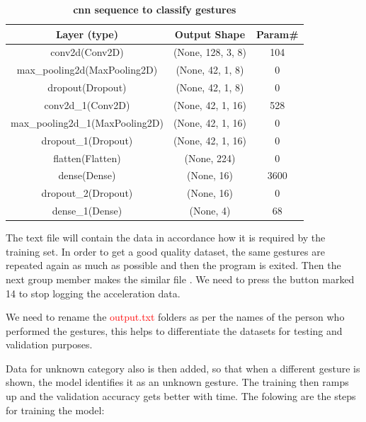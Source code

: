 \begin{table}
    \caption{\textbf{\ac{cnn} sequence to classify gestures }}
    \label{Table 7.1}
    
    \begin{center}
        \begin{tabular}{||c c c||} 
            \hline
            Layer (type) & Output Shape & Param\# \\ [0.5ex] 
            \hline\hline
            conv2d(Conv2D) & (None, 128, 3, 8) & 104 \\ 
            \hline
            max\_pooling2d(MaxPooling2D) & (None, 42, 1, 8) & 0 \\
            \hline
            dropout(Dropout) & (None, 42, 1, 8) & 0  \\
            \hline
            conv2d\_1(Conv2D) & (None, 42, 1, 16) & 528 \\
            \hline
            max\_pooling2d\_1(MaxPooling2D) & (None, 42, 1, 16) & 0 \\  
            \hline
            dropout\_1(Dropout) & (None, 42, 1, 16) & 0  \\
            \hline
            flatten(Flatten) & (None, 224) & 0  \\
            \hline
            dense(Dense) & (None, 16) & 3600  \\  
            \hline
            dropout\_2(Dropout) & (None, 16) & 0  \\
            \hline
            dense\_1(Dense) & (None, 4) & 68  \\ [1ex] 
            \hline
        \end{tabular}
    \end{center}
\end{table}	

The text file will contain the data in accordance how it is required by the training set. In order to get a good quality dataset, the same gestures are repeated again as much as possible and then the program is exited. Then the next group member makes the similar file  . We need to press the button marked 14 to stop logging the acceleration data.

We need to rename the \textcolor{red}{output.txt} folders as per the names of the person who performed the gestures, this helps to differentiate the datasets for testing and validation purposes. \cite{Warden:2020}  

Data for unknown category also is then added, so that when a different gesture is shown, the model identifies it as an unknown gesture.  The training then ramps up and the validation accuracy gets better with time. The folowing are the steps for training the model:

